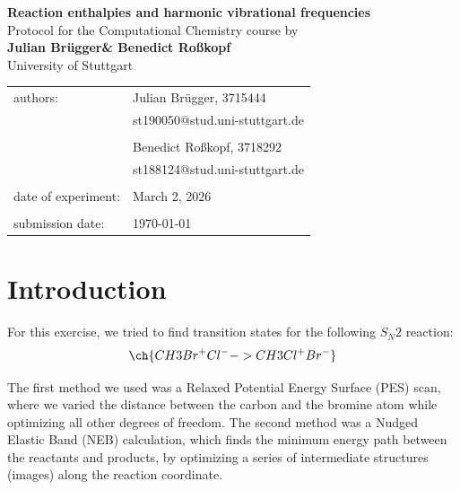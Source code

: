 \documentclass[a4paper,12pt]{scrartcl}
\makeatletter
\newcommand{\VERSUCHSDATUM}{March 2, 2026}
\newcommand{\PROTOKOLLDATUM}{\today}
\newcommand{\VerfasserEINS}{Julian Brügger}
\newcommand{\MatNoEINS}{3715444}
\newcommand{\EmailEINS}{st190050@stud.uni-stuttgart.de}
\newcommand{\VerfasserZWEI}{Benedict Roßkopf}
\newcommand{\MatNoZWEI}{3718292}
\newcommand{\EmailZWEI}{st188124@stud.uni-stuttgart.de}
\newcommand{\VERSUCHSNAME}{Reaction enthalpies and harmonic vibrational frequencies}
\makeatother
\begin{document}
\begin{titlepage}
\begin{center}
\Huge{\textbf{\VERSUCHSNAME}}\\
\vspace{10mm}
\Large{Protocol for the Computational Chemistry course by \\ \textbf{\VerfasserEINS\;\& \VerfasserZWEI }}\\
\vspace{10mm} 
\Large{University of Stuttgart}\\
\end{center}
\begin{center}
\begin{tabular}{ll}
\large{authors:}        & \large{\VerfasserEINS, \MatNoEINS} \\
                        & \large{\EmailEINS} \\
                        \vspace{2mm}\\
                        & \large{\VerfasserZWEI, \MatNoZWEI} \\
                        & \large{\EmailZWEI} \\						
                        \vspace{0cm}\\
\large{date of experiment:}	& \large{\VERSUCHSDATUM} \\
\vspace{0cm}\\
\large{submission date:} & \large{\PROTOKOLLDATUM}
\end{tabular}
\end{center}
\end{titlepage}

\section{Introduction}

For this exercise, we tried to find transition states for the following $S_N 2$ reaction:
\begin{align*}
    \ch{CH3Br^+Cl^- -> CH3Cl^+Br^-}
\end{align*}

The first method we used was a Relaxed Potential Energy Surface (PES) scan, where we varied the distance between the carbon and the bromine atom while optimizing all other degrees of freedom. The second method was a Nudged Elastic Band (NEB) calculation, which finds the minimum energy path between the reactants and products, by optimizing a series of intermediate structures (images) along the reaction coordinate.
\end{document}
